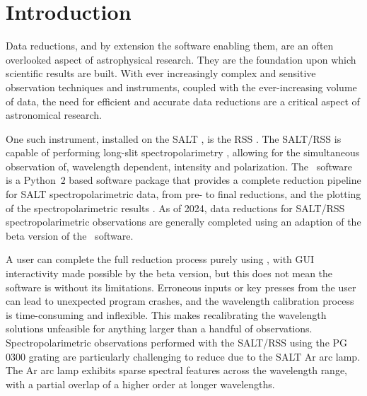 \chapter{Introduction} \label{ch:01}

Data reductions, and by extension the software enabling them, are an often overlooked aspect of astrophysical research.
They are the foundation upon which scientific results are built.
With ever increasingly complex and sensitive observation techniques and instruments, coupled with the ever-increasing volume of data, the need for efficient and accurate data reductions are a critical aspect of astronomical research.

One such instrument, installed on the \gls{SALT} \citep{SALT_design}, is the \gls{RSS} \citep{SALT_optical_design}.
The \gls{SALT}/\gls{RSS} is capable of performing long-slit spectropolarimetry \citep{SALT_hires}, allowing for the simultaneous observation of, wavelength dependent, intensity and polarization.
The \polsalt\ software is a Python~$2$ based software package that provides a complete reduction pipeline for \gls{SALT} spectro\-polarimetric data, from pre- to final reductions, and the plotting of the spectro\-polarimetric results \citep{polsalt}.
As of 2024, data reductions for \gls{SALT}/\gls{RSS} spectropolarimetric observations are generally completed using an adaption of the beta version of the \polsalt\ software.%

A user can complete the full reduction process purely using \polsalt, with \gls{GUI} interactivity made possible by the beta version, but this does not mean the software is without its limitations.
Erroneous inputs or key presses from the user can lead to unexpected program crashes, and the wavelength calibration process is time-consuming and inflexible.
This makes recalibrating the wavelength solutions unfeasible for anything larger than a handful of observations.
Spectro\-polarimetric observations performed with the \gls{SALT}/\gls{RSS} using the PG$0300$ grating are particularly challenging to reduce due to the \gls{SALT} \gls{Ar} arc lamp.
The \gls{Ar} arc lamp exhibits sparse spectral features across the wavelength range, with a partial overlap of a higher order at longer wavelengths.

